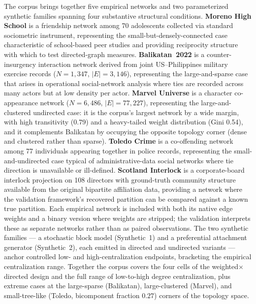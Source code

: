\documentclass[11pt]{article}
\begin{document}
The corpus brings together five empirical networks and two parameterized synthetic families spanning four substantive structural conditions. \textbf{Moreno High School} is a friendship network among 70 adolescents collected via standard sociometric instrument, representing the small-but-densely-connected case characteristic of school-based peer studies and providing reciprocity structure with which to test directed-graph measures. \textbf{Balikatan~2022} is a counter-insurgency interaction network derived from joint US–Philippines military exercise records ($N = 1{,}347$, $\lvert E \rvert = 3{,}146$), representing the large-and-sparse case that arises in operational social-network analysis where ties are recorded across many actors but at low density per actor. \textbf{Marvel Universe} is a character co-appearance network ($N = 6{,}486$, $\lvert E \rvert = 77{,}227$), representing the large-and-clustered undirected case: it is the corpus's largest network by a wide margin, with high transitivity (0.79) and a heavy-tailed weight distribution (Gini 0.54), and it complements Balikatan by occupying the opposite topology corner (dense and clustered rather than sparse). \textbf{Toledo Crime} is a co-offending network among 77 individuals appearing together in police records, representing the small-and-undirected case typical of administrative-data social networks where tie direction is unavailable or ill-defined. \textbf{Scotland Interlock} is a corporate-board interlock projection on 108 directors with ground-truth community structure available from the original bipartite affiliation data, providing a network where the validation framework's recovered partition can be compared against a known true partition. Each empirical network is included with both its native edge weights and a binary version where weights are stripped; the validation interprets these as separate networks rather than as paired observations. The two synthetic families — a stochastic block model (Synthetic~1) and a preferential attachment generator (Synthetic~2), each emitted in directed and undirected variants — anchor controlled low- and high-centralization endpoints, bracketing the empirical centralization range. Together the corpus covers the four cells of the weighted$\times$directed design and the full range of low-to-high degree centralization, plus extreme cases at the large-sparse (Balikatan), large-clustered (Marvel), and small-tree-like (Toledo, bicomponent fraction $0.27$) corners of the topology space.
\end{document}

